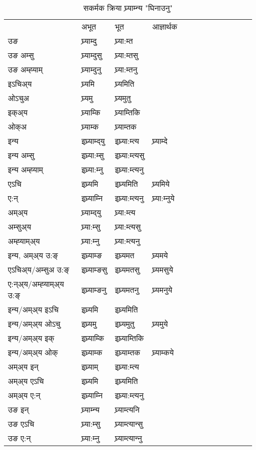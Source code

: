 \begin{table}[H]
\centering
\caption{\label{ɛmt.vt} सकर्मक क्रिया  घ्र्याम्‍न्य  "घिनाउनु"  }
\begin{tabular}{l|l|l|l|l|l|l|l|l|l|l|l|l}  \toprule
&अभूत & भूत & आज्ञार्थक \\ 
उङ &घ्र्याम्दु &घ्र्या:म्त \\ 
उङ अम्सु&घ्र्याम्दुसु &घ्र्या:म्तसु \\ 
उङ अम्ह्‍याम्&घ्र्याम्दुनु &घ्र्या:म्तनु \\ 
इऽचिअ्य &घ्र्यमि &घ्र्यमिति   \\ 
ओऽचुअ        &घ्र्यमु &घ्र्यमुतु   \\ 
इक्अ्य&घ्र्याम्कि &घ्र्याम्तिकि   \\ 
ओक्अ &घ्र्याम्क &घ्र्याम्तक   \\ 
इन्य & इघ्र्याम्द्‌यु  & इघ्र्या:म्त्य &घ्र्याम्दे  \\ 
इन्य अम्सु& इघ्र्या:म्सु  & इघ्र्या:म्त्यसु   \\ 
इन्य अम्ह्‍याम्& इघ्र्या:म्‍नु  & इघ्र्या:म्त्यनु   \\ 
एऽचि & इघ्र्यमि & इघ्र्यमिति &घ्र्यमिये    \\ 
ए:न् & इघ्र्याम्‍नि  & इघ्र्या:म्त्यनु &घ्र्या:म्‍नुये  \\ 
अम्अ्य & घ्र्याम्द्‌यु  & घ्र्या:म्त्य  \\ 
अम्सुअ्य & घ्र्या:म्सु & घ्र्या:म्त्यसु  \\ 
अम्ह्‍याम्अ्य & घ्र्या:म्‍नु  & घ्र्या:म्त्यनु \\ 
\midrule
इन्य, अम्अ्य उ:ङ्‌ &इघ्र्याम्ङ &इघ्र्यमत &घ्र्यमये \\ 
एऽचिअ्य/अम्सुअ उ:ङ्‌ &इघ्र्याम्ङसु &इघ्र्यमतसु &घ्र्यमसुये \\ 
ए:न्अ्य/अम्ह्‍याम्अ्य उ:ङ्‌ &इघ्र्याम्ङनु &इघ्र्यमतनु &घ्र्यमनुये \\ 
इन्य/अम्अ्य इऽचि &इघ्र्यमि &इघ्र्यमिति    \\ 
इन्य/अम्अ्य ओऽचु &इघ्र्यमु &इघ्र्यमुतु  &घ्र्यमुये  \\ 
इन्य/अम्अ्य इक् &इघ्र्याम्कि &इघ्र्याम्तिकि   \\ 
इन्य/अम्अ्य ओक् &इघ्र्याम्क &इघ्र्याम्तक  &घ्र्याम्कये  \\ 
अम्अ्य इन् & इघ्र्याम् & इघ्र्या:म्त्य   \\ 
अम्अ्य एऽचि & इघ्र्यमि & इघ्र्यमिति    \\ 
अम्अ्य ए:न् & इघ्र्याम्‍नि  & इघ्र्या:म्त्यनु  \\ 
\midrule
उङ इन् & घ्र्याम्‍न्य  & घ्र्याम्त्यनि  \\ 
उङ एऽचि & घ्र्या:म्सु  & घ्र्याम्त्यान्सु   \\ 
उङ ए:न्& घ्र्या:म्‍नु  & घ्र्याम्त्यान्‍नु   \\ 
\bottomrule
\end{tabular}
\end{table}


